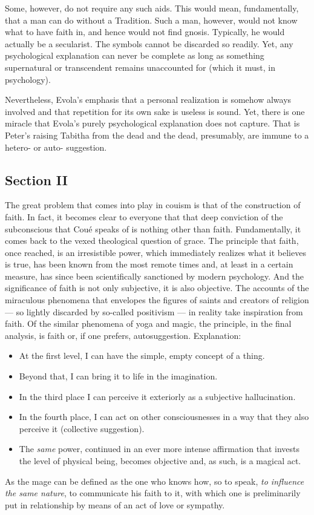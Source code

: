 \begin{quotationx}
Some, however, do not require any such aids. This would mean, fundamentally, that a man can do without a Tradition. Such a man, however, would not know what to have faith in, and hence would not find gnosis. Typically, he would actually be a secularist. The symbols cannot be discarded so readily. Yet, any psychological explanation can never be complete as long as something supernatural or transcendent remains unaccounted for (which it must, in psychology).

Nevertheless, Evola's emphasis that a personal realization is somehow always involved and that repetition for its own sake is useless is sound. Yet, there is one miracle that Evola's purely psychological explanation does not capture. That is Peter's raising Tabitha from the dead and the dead, presumably, are immune to a hetero- or auto- suggestion.

\end{quotationx}

\subsection*{Section II}
The great problem that comes into play in couism is that of the construction of faith. In fact, it becomes clear to everyone that that deep conviction of the subconscious that Coué speaks of is nothing other than faith. Fundamentally, it comes back to the vexed theological question of grace. The principle that faith, once reached, is an irresistible power, which immediately realizes what it believes is true, has been known from the most remote times and, at least in a certain measure, has since been scientifically sanctioned by modern psychology. And the significance of faith is not only subjective, it is also objective. The accounts of the miraculous phenomena that envelopes the figures of saints and creators of religion — so lightly discarded by so-called positivism — in reality take inspiration from faith. Of the similar phenomena of yoga and magic, the principle, in the final analysis, is faith or, if one prefers, autosuggestion. Explanation:

\begin{itemize}
\item At the first level, I can have the simple, empty concept of a thing. 
\item Beyond that, I can bring it to life in the imagination. 
\item In the third place I can perceive it exteriorly as a subjective hallucination. 
\item In the fourth place, I can act on other consciousnesses in a way that they also perceive it (collective suggestion). 
\item The \textit{same} power, continued in an ever more intense affirmation that invests the level of physical being, becomes objective and, as such, is a magical act. 
\end{itemize}
As the mage can be defined as the one who knows how, so to speak, \textit{to influence the same nature}, to communicate his faith to it, with which one is preliminarily put in relationship by means of an act of love or sympathy.

